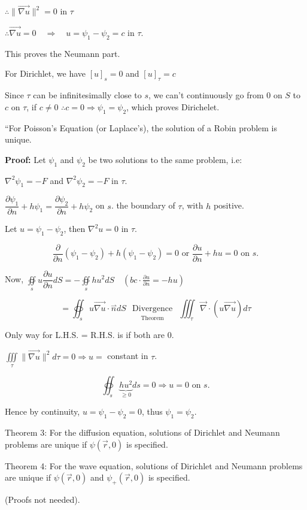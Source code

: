 \documentclass{report}
\begin{document}
$\therefore\|\overrightarrow{\nabla u}\|^2=0$ in $\tau$

$\therefore\overrightarrow{\nabla u}=0\quad\Rightarrow\quad u=\psi_1-\psi_2=c$ in $\tau$.


This proves the Neumann part.

For Dirichlet, we have $[u]_{s}=0$ and $[u]_{\tau}=c$

Since $\tau$ can be infinitesimally close to $s$, we can't continuously go from 0 on $S$ to $c$ on $\tau$, if $c \neq 0$ $\therefore c=0 \Rightarrow \psi_{1}=\psi_{2}$, which proves Dirichelet.

``For Poisson's Equation (or Laplace's), the solution of a Robin problem is unique.

\textbf{Proof:} Let $\psi_{1}$ and $\psi_{2}$ be two solutions to the same problem, i.e:

$\nabla^{2} \psi_{1}=-F$ and $\nabla^{2} \psi_{2}=-F$ in $\tau$.

$\dfrac{\partial \psi_{1}}{\partial n}+h \psi_{1}=\dfrac{\partial \psi_{2}}{\partial n}+h \psi_{2}$ on $s$. the boundary of $\tau$, with $h$ positive.

Let $u=\psi_{1}-\psi_{2}$, then $\nabla^{2} u=0$ in $\tau$.

$$
\dfrac{\partial}{\partial n}\left(\psi_{1}-\psi_{2}\right)+h\left(\psi_{1}-\psi_{2}\right)=0 \text { or } \frac{\partial u}{\partial n}+h u=0 \text { on } s .
$$

Now, $\oiint\limits_{s} u \dfrac{\partial u}{\partial n} d S=-\oiint\limits_{s} h u^{2} d S \quad\left(b c \cdot \frac{\partial u}{\partial n}=-h u\right)$

$$
=\oiint_{s} u \overrightarrow{\nabla u} \cdot \stackrel{\rightharpoonup}{n} d S \underset{\text { Theorem }}{\substack{\text { Divergence }}} \iiint_{\tau} \vec{\nabla} \cdot(u \overrightarrow{\nabla u}) d \tau
$$

Only way for L.H.S. = R.H.S. is if both are $0$.

$\iiint\limits_{\tau}\|\overrightarrow{\nabla u}\|^{2} d \tau=0 \Rightarrow u=$ constant in $\tau$.

$$
\oiint_{s} \underbrace{h u^{2}}_{\geqslant 0} d s=0 \Rightarrow u=0 \text { on } s.
$$

Hence by continuity, $u=\psi_{1}-\psi_{2}=0$, thus $\psi_{1}=\psi_{2}$.

Theorem 3: For the diffusion equation, solutions of Dirichlet and Neumann problems are unique if $\psi(\vec{r}, 0)$ is specified.

Theorem 4: For the wave equation, solutions of Dirichlet and Neumann problems are unique if $\psi(\vec{r}, 0)$ and $\psi_{+}(\vec{r}, 0)$ is specified.

(Proofs not needed).
\end{document}
